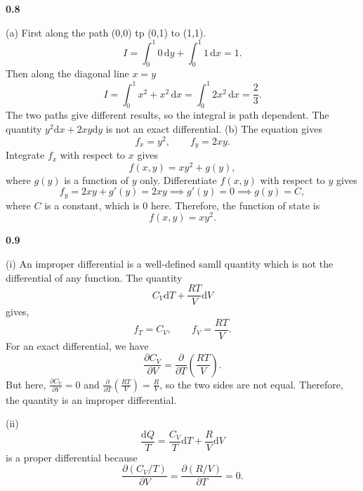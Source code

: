 \documentclass[12pt]{article}
\newcommand{\problem}[2]{%
    \par\vspace{1em}
    \noindent\textbf{#1\quad #2}
    \par\smallskip
}
\begin{document}
\problem{0.8}{}
\noindent(a)
First along the path (0,0) tp (0,1) to (1,1).
\begin{equation}
    I = \int_0^1 0\, \mathrm{d}y + \int_0^1 1 \,\mathrm{d}x = 1.
\end{equation}
 Then along the diagonal line $x=y$
\begin{equation}
    I = \int_0^1 x^2 + x^2 \,\mathrm{d}x = \int_0^1 2x^2 \,\mathrm{d}x = \frac{2}{3}.
\end{equation}
The two paths give different results, so the integral is path dependent. The quantity $y^2 \mathrm{d}x + 2xy \mathrm{d}y$ is not an exact differential.
\smallbreak
\noindent(b) The equation gives 
\begin{equation}
    f_x = y^2, \qquad f_y = 2xy.
\end{equation}
Integrate $f_x$ with respect to $x$ gives
\begin{equation}
    f(x,y) = xy^2 + g(y),
\end{equation}
where $g(y)$ is a function of $y$ only. Differentiate $f(x,y)$ with respect to $y$ gives
\begin{equation}
    f_y = 2xy + g'(y) = 2xy \implies g'(y) = 0 \implies g(y) = C,
\end{equation}
where $C$ is a constant, which is 0 here. Therefore, the function of state is
\begin{equation}
    f(x,y) = xy^2.
\end{equation}


\problem{0.9}{} 
\noindent(i) An improper differential is a well-defined samll quantity which is not the differential of any function.
The quantity
\begin{equation}
    C_V\mathrm{d}T + \frac{RT}{V}\mathrm{d}V
\end{equation}
gives,
\begin{equation}
    f_{T} = C_V, \qquad f_{V} = \frac{RT}{V}.
\end{equation}
For an exact differential, we have
\begin{equation}
    \frac{\partial C_V}{\partial V} = \frac{\partial}{\partial T}\left(\frac{RT}{V}\right).
\end{equation}
But here, $\frac{\partial C_V}{\partial V} = 0$ and $\frac{\partial}{\partial T}\left(\frac{RT}{V}\right) = \frac{R}{V}$, so the two sides are not equal. Therefore, the quantity is an improper differential.

\pagebreak
\noindent(ii) 
\begin{equation}
    \frac{\mathrm{d}Q}{T} = \frac{C_V}{T}\mathrm{d}T + \frac{R}{V}\mathrm{d}V
\end{equation}
is a proper differential because
\begin{equation}
    \frac{\partial (C_V / T)}{\partial V} = \frac{\partial (R/V)}{\partial T} = 0.
\end{equation}
\end{document}

